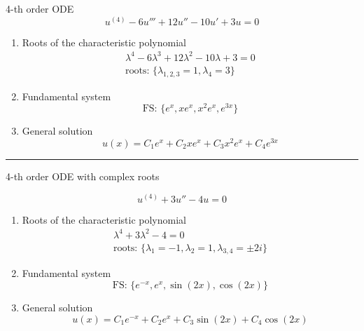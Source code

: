 \begin{examplesection}
    4-th order ODE
    \begin{equation*}
        u^{(4)} - 6u''' + 12u'' -10u' + 3u = 0 %
    \end{equation*}
    \begin{enumerate}
        \item Roots of the characteristic polynomial
              \begin{gather*}
                  \lambda^4 - 6\lambda^3 + 12\lambda^2 - 10\lambda + 3 = 0\\
                  \text{roots: }\{ \lambda_{1,2,3} = 1, \lambda_4 = 3\}
              \end{gather*}
        \item Fundamental system
              \begin{equation*}
                  \text{FS: } \{e^x, xe^x, x^2e^x, e^{3x}\}
              \end{equation*}
        \item General solution
              \begin{equation*}
                  u(x) = C_1e^x + C_2xe^x + C_3x^2e^x + C_4e^{3x}
              \end{equation*}
    \end{enumerate}

    \hrule

    4-th order ODE with complex roots

    \begin{equation*}
        u^{(4)} + 3u'' - 4u = 0
    \end{equation*}
    \begin{enumerate}
        \item Roots of the characteristic polynomial
              \begin{gather*}
                  \lambda^4 + 3\lambda^2 - 4 = 0\\
                  \text{roots: }\{ \lambda_1 = -1, \lambda_2 = 1, \lambda_{3,4} = \pm 2i\}
              \end{gather*}
        \item Fundamental system
              \begin{equation*}
                  \text{FS: } \{e^{-x}, e^x, \sin(2x), \cos(2x)\}
              \end{equation*}
        \item General solution
              \begin{equation*}
                  u(x) = C_1e^{-x} + C_2e^x + C_3\sin(2x) + C_4\cos(2x)
              \end{equation*}
    \end{enumerate}
\end{examplesection}

